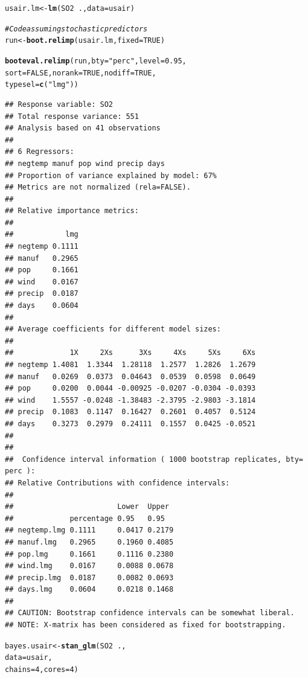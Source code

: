 \documentclass[11pt,a4paper,twoside]{book}\usepackage[]{graphicx}\usepackage[]{color}
\makeatletter
\newcommand{\hlnum}[1]{\textcolor[rgb]{0.686,0.059,0.569}{#1}}%
\newcommand{\hlstr}[1]{\textcolor[rgb]{0.192,0.494,0.8}{#1}}%
\newcommand{\hlcom}[1]{\textcolor[rgb]{0.678,0.584,0.686}{\textit{#1}}}%
\newcommand{\hlopt}[1]{\textcolor[rgb]{0,0,0}{#1}}%
\newcommand{\hlstd}[1]{\textcolor[rgb]{0.345,0.345,0.345}{#1}}%
\newcommand{\hlkwb}[1]{\textcolor[rgb]{0.69,0.353,0.396}{#1}}%
\newcommand{\hlkwc}[1]{\textcolor[rgb]{0.333,0.667,0.333}{#1}}%
\newcommand{\hlkwd}[1]{\textcolor[rgb]{0.737,0.353,0.396}{\textbf{#1}}}%
\newenvironment{kframe}{%
 \def\at@end@of@kframe{}%
 \ifinner\ifhmode%
  \def\at@end@of@kframe{\end{minipage}}%
  \begin{minipage}{\columnwidth}%
 \fi\fi%
 \def\FrameCommand##1{\hskip\@totalleftmargin \hskip-\fboxsep
 \colorbox{shadecolor}{##1}\hskip-\fboxsep
     \hskip-\linewidth \hskip-\@totalleftmargin \hskip\columnwidth}%
 \MakeFramed {\advance\hsize-\width
   \@totalleftmargin\z@ \linewidth\hsize
   \@setminipage}}%
 {\par\unskip\endMakeFramed%
 \at@end@of@kframe}
\newenvironment{knitrout}{}{} %
\makeatother
\begin{document}
\begin{knitrout}
\color{fgcolor}\begin{kframe}
\begin{alltt}
\hlstd{usair.lm} \hlkwb{<-} \hlkwd{lm}\hlstd{(SO2}\hlopt{~}\hlstd{.,} \hlkwc{data} \hlstd{= usair)}


\hlcom{#Code assuming stochastic predictors}
\hlstd{run}\hlkwb{<-}\hlkwd{boot.relimp}\hlstd{(usair.lm,} \hlkwc{fixed}\hlstd{=}\hlnum{TRUE}\hlstd{)}

\hlkwd{booteval.relimp}\hlstd{(run,} \hlkwc{bty} \hlstd{=} \hlstr{"perc"}\hlstd{,} \hlkwc{level} \hlstd{=} \hlnum{0.95}\hlstd{,}
                \hlkwc{sort} \hlstd{=} \hlnum{FALSE}\hlstd{,} \hlkwc{norank} \hlstd{=} \hlnum{TRUE}\hlstd{,} \hlkwc{nodiff} \hlstd{=} \hlnum{TRUE}\hlstd{,}
                \hlkwc{typesel} \hlstd{=} \hlkwd{c}\hlstd{(}\hlstr{"lmg"}\hlstd{))}
\end{alltt}
\begin{verbatim}
## Response variable: SO2 
## Total response variance: 551 
## Analysis based on 41 observations 
## 
## 6 Regressors: 
## negtemp manuf pop wind precip days 
## Proportion of variance explained by model: 67%
## Metrics are not normalized (rela=FALSE). 
## 
## Relative importance metrics: 
## 
##            lmg
## negtemp 0.1111
## manuf   0.2965
## pop     0.1661
## wind    0.0167
## precip  0.0187
## days    0.0604
## 
## Average coefficients for different model sizes: 
## 
##             1X     2Xs      3Xs     4Xs     5Xs     6Xs
## negtemp 1.4081  1.3344  1.28118  1.2577  1.2826  1.2679
## manuf   0.0269  0.0373  0.04643  0.0539  0.0598  0.0649
## pop     0.0200  0.0044 -0.00925 -0.0207 -0.0304 -0.0393
## wind    1.5557 -0.0248 -1.38483 -2.3795 -2.9803 -3.1814
## precip  0.1083  0.1147  0.16427  0.2601  0.4057  0.5124
## days    0.3273  0.2979  0.24111  0.1557  0.0425 -0.0521
## 
##  
##  Confidence interval information ( 1000 bootstrap replicates, bty= perc ): 
## Relative Contributions with confidence intervals: 
##  
##                        Lower  Upper
##             percentage 0.95   0.95  
## negtemp.lmg 0.1111     0.0417 0.2179
## manuf.lmg   0.2965     0.1960 0.4085
## pop.lmg     0.1661     0.1116 0.2380
## wind.lmg    0.0167     0.0088 0.0678
## precip.lmg  0.0187     0.0082 0.0693
## days.lmg    0.0604     0.0218 0.1468
## 
## CAUTION: Bootstrap confidence intervals can be somewhat liberal. 
## NOTE: X-matrix has been considered as fixed for bootstrapping.
\end{verbatim}
\begin{alltt}
\hlstd{bayes.usair} \hlkwb{<-} \hlkwd{stan_glm}\hlstd{(SO2} \hlopt{~} \hlstd{. ,}
                  \hlkwc{data} \hlstd{= usair,}
                  \hlkwc{chains} \hlstd{=} \hlnum{4}\hlstd{,} \hlkwc{cores} \hlstd{=} \hlnum{4}\hlstd{)}


\end{alltt}
\end{kframe}
\end{knitrout}
\end{document}
